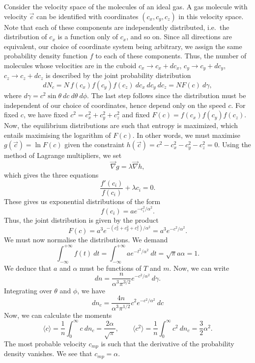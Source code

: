 \documentclass[11pt]{article}
\newcommand\ve[1]{\vec{#1}}
\newcommand\grad[1]{\ve{\nabla}#1}
\newcommand\E[1]{\langle #1 \rangle}
\theoremstyle{definition}
\theoremstyle{remark}
\numberwithin{equation}{section}
\begin{document}
    Consider the velocity space of the molecules of an ideal gas. A gas molecule
    with velocity $\ve{c}$ can be identified with coordinates $(c_x, c_y, c_z)$ in
    this velocity space. Note that each of these components are independently
    distributed, i.e.\ the distribution of $c_x$ is a function only of $c_x$, and so
    on. Since all directions are equivalent, our choice of coordinate system being
    arbitrary, we assign the same probability density function $f$ to each of these
    components. Thus, the number of molecules whose velocities are in the cuboid
    $c_x \to c_x + dc_x$, $c_y \to c_y + dc_y$, $c_z \to c_z + dc_z$ is described by
    the joint probability distribution \[
        dN_c = N\, f(c_x)f(c_y)f(c_z)\:dc_x\:dc_y\:dc_z = N F(c)\:d\gamma,
    \] where $d\gamma = c^2\sin\theta\:dc\:d\theta\:d\phi$.
    The last step follows since the distribution must be independent of our
    choice of coordinates, hence depend only on the speed $c$. For fixed $c$, we
    have fixed $c^2 = c_x^2 + c_y^2 + c_z^2$ and fixed $F(c) = f(c_x)f(c_y)f(c_z)$.
    Now, the equilibrium distributions are such that entropy is maximized, which
    entails maximising the logarithm of $F(c)$.  In other words, we must maximise
    $g(\vec{c}) = \ln{F(c)}$ given the constraint $h(\ve{c}) = c^2 - c_x^2 - c_y^2 -
    c_z^2 = 0$. Using the method of Lagrange multipliers, we set \[
        \grad{g} = \lambda \grad{h},
    \] which gives the three equations \[
        \frac{f'(c_i)}{f(c_i)} + \lambda c_i = 0.
    \] These gives us exponential distributions of the form \[
        f(c_i) = a e^{-c_i^2 / \alpha^2}.
    \] Thus, the joint distribution is given by the product \[
        F(c) = a^3e^{-(c_x^2 + c_y^2 + c_z^2) /\alpha^2} = a^3e^{-c^2 / \alpha^2}.
    \] We must now normalise the distributions. We demand \[
        \int_{-\infty}^{+\infty} f(t)\:dt = \int_{-\infty}^{+\infty} ae^{-t^2 /
        \alpha^2}\:dt = \sqrt{\pi}a\alpha = 1.
    \] We deduce that $a$ and $\alpha$ must be functions of $T$ and $m$.
    Now, we can write \[
        dn = \frac{n}{\alpha^3\pi^{3 / 2}} e^{-c^2 / \alpha^2} \:d\gamma.
    \] Integrating over $\theta$ and $\phi$, we have \[
        dn_c = \frac{4n}{\alpha^3\pi^{1 /2}} c^2 e^{-c^2 / \alpha^2} \:dc
    \] Now, we can calculate the moments \[
        \E{c} = \frac{1}{n}\int_0^\infty c\:dn_c = \frac{2\alpha}{\sqrt{\pi}}, \qquad
        \E{c^2} = \frac{1}{n}\int_0^\infty c^2\:dn_c = \frac{3}{2}\alpha^2.
    \] The most probable velocity $c_{mp}$ is such that the derivative of the
    probability density vanishes. We see that $c_{mp} = \alpha$.
\end{document}
